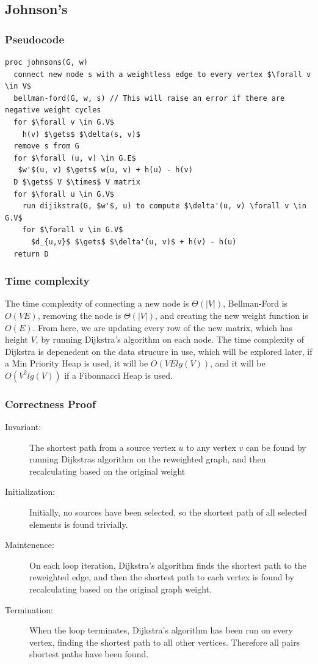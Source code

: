 \documentclass[a4paper,12pt]{article}
\begin{document}
\subsection{Johnson's}
\subsubsection{Pseudocode}
\begin{lstlisting}[mathescape=true]
proc johnsons(G, w)
  connect new node s with a weightless edge to every vertex $\forall v \in V$
  bellman-ford(G, w, s) // This will raise an error if there are negative weight cycles
  for $\forall v \in G.V$
    h(v) $\gets$ $\delta(s, v)$
  remove s from G
  for $\forall (u, v) \in G.E$
   $w'$(u, v) $\gets$ w(u, v) + h(u) - h(v)
  D $\gets$ V $\times$ V matrix
  for $\forall u \in G.V$
    run dijikstra(G, $w'$, u) to compute $\delta'(u, v) \forall v \in G.V$
    for $\forall v \in G.V$
      $d_{u,v}$ $\gets$ $\delta'(u, v)$ + h(v) - h(u)
  return D
\end{lstlisting}
\subsubsection{Time complexity}
The time complexity of connecting a new node is $\Theta(|V|)$, Bellman-Ford is $O(VE)$, removing the node is $\Theta(|V|)$, and creating the new weight function is $O(E)$. From here, we are updating every row of the new matrix, which has height $V$, by running Dijkstra's algorithm on each node. The time complexity of Dijkstra is depenedent on the data strucure in use, which will be explored later, if a Min Priority Heap is used, it will be $O(VElg(V))$, and it will be $O(V^2lg(V))$ if a Fibonnacci Heap is used.
\subsubsection{Correctness Proof}
\begin{description}
\item [Invariant: ] The shortest path from a source vertex $u$ to any vertex $v$ can be found by running Dijkstras algorithm on the reweighted graph, and then recalculating based on the original weight
\item [Initialization: ] Initially, no sources have been selected, so the shortest path of all selected elements is found trivially.
\item [Maintenence: ] On each loop iteration, Dijkstra's algorithm finds the shortest path to the reweighted edge, and then the shortest path to each vertex is found by recalculating based on the original graph weight.
\item [Termination: ] When the loop terminates, Dijkstra's algorithm has been run on every vertex, finding the shortest path to all other vertices. Therefore all pairs shortest paths have been found.
\end{description}
\end{document}
